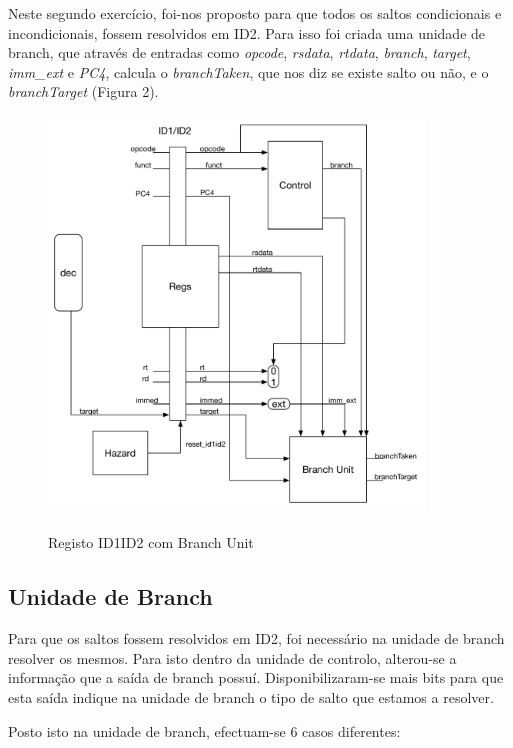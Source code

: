 \documentclass[pdftex,12pt,a4paper]{report}
\begin{document}
Neste segundo exercício, foi-nos proposto para que todos os saltos condicionais e incondicionais, fossem resolvidos em ID2. Para isso foi criada uma unidade de branch, que através de entradas como \textit{opcode}, \textit{rsdata}, \textit{rtdata}, \textit{branch}, \textit{target}, \textit{imm\_ext} e \textit{PC4}, calcula o \textit{branchTaken}, que nos diz se existe salto ou não, e o \textit{branchTarget} (Figura 2).

\begin{figure}[!htb]
\center
 \includegraphics[width=100mm,scale=1]{ID1ID2ex2.pdf}
 \caption{\\Registo ID1ID2 com Branch Unit}\label{fig:ex2RegID1ID2}
\end{figure}

\subsection{Unidade de Branch}

Para que os saltos fossem resolvidos em ID2, foi necessário na unidade de branch resolver os mesmos. Para isto dentro da unidade de controlo, alterou-se a informação que a saída de branch possuí. Disponibilizaram-se mais bits para que esta saída indique na unidade de branch o tipo de salto que estamos a resolver.

Posto isto na unidade de branch, efectuam-se 6 casos diferentes:
\end{document}
